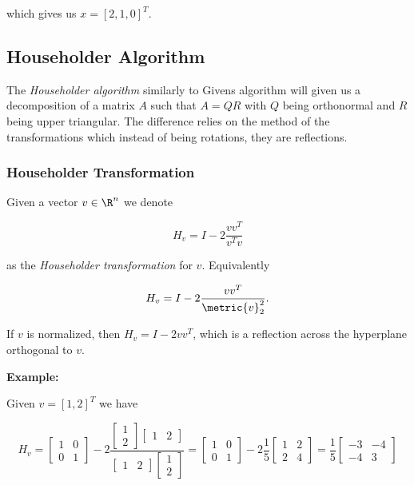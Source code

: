 which gives us \(x = [2, 1, 0]^T\).

\subsection{Householder Algorithm}

The \emph{Householder algorithm} similarly to Givens algorithm will given us a decomposition of a matrix \(A\) 
such that \(A = QR\) with \(Q\) being orthonormal and \(R\) being upper triangular. The difference relies on the method of the transformations 
which instead of being rotations, they are reflections.

\subsubsection{Householder Transformation}

Given a vector \(v \in \R^n\) we denote 

\[
    H_v = I - 2 \frac{vv^T}{v^Tv}
\]

as the \emph{Householder transformation} for \(v\). Equivalently 

\[
    H_v = I - 2 \frac{vv^T}{\metric{v}_2^2}.
\]

If \(v\) is normalized, then \(H_v = I - 2 vv^T\), which is a reflection across the hyperplane orthogonal to \(v\).

\textbf{Example:}

Given \(v = [1, 2]^T\) we have

\[
    H_v = 
    \begin{bmatrix}
        1 & 0 \\ 
        0 & 1
    \end{bmatrix}
    - 2
    \frac{
        \begin{bmatrix}
            1 \\ 2
        \end{bmatrix}
        \begin{bmatrix}
            1 & 2
        \end{bmatrix}
    }{\begin{bmatrix}
        1 & 2
    \end{bmatrix}    
    \begin{bmatrix}
        1 \\ 2
    \end{bmatrix}}
    =
    \begin{bmatrix}
        1 & 0 \\ 
        0 & 1
    \end{bmatrix}
    - 2 \frac{1}{5}
    \begin{bmatrix}
        1 & 2 \\ 
        2 & 4
    \end{bmatrix}
    =
    \frac{1}{5}
    \begin{bmatrix}
        -3 & -4 \\ 
        -4 & 3
    \end{bmatrix}
\]

